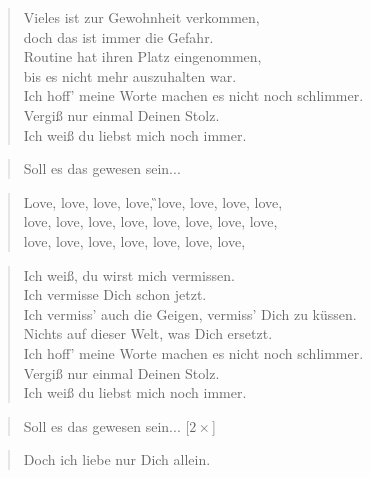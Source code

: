 \documentclass[9pt,a4paper,oneside, onecolumn]{article}
\begin{document}
\begin{verse}
\qquad Vieles ist zur Gewohnheit verkommen,\\
\qquad doch das ist immer die Gefahr.\\
\qquad Routine hat ihren Platz eingenommen,\\
\qquad bis es nicht mehr auszuhalten war.\\

\qquad Ich hoff' meine Worte machen es nicht noch schlimmer.\\
\qquad Vergiß nur einmal Deinen Stolz.\\
\qquad Ich weiß du liebst mich noch immer.\\
\end{verse}

\begin{verse}
\qquad Soll es das gewesen sein...\\
\end{verse}

\begin{verse}
\qquad \Em{}Love, love, \Fism{}love, love, \G{}love, love, \A{}love, love,\\
\qquad love, love, love, love, love, love, love, love,\\
\qquad \C{}love, love, love, love, \D{}love, love, love,\\
\end{verse}

\begin{verse}
\qquad Ich weiß, du wirst mich vermissen.\\
\qquad Ich vermisse Dich schon jetzt.\\
\qquad Ich vermiss' auch die Geigen, vermiss' Dich zu küssen.\\
\qquad Nichts auf dieser Welt, was Dich ersetzt.\\

\qquad Ich hoff' meine Worte machen es nicht noch schlimmer.\\
\qquad Vergiß nur einmal Deinen Stolz.\\
\qquad Ich weiß du liebst mich noch immer.\\
\end{verse}

\begin{verse}
\qquad Soll es das gewesen sein... [$2\times$]\\
\end{verse}


\begin{verse}
\qquad \Em{}Doch ich liebe nur \C{}Dich allein.\\
\end{verse}

\end{document}
